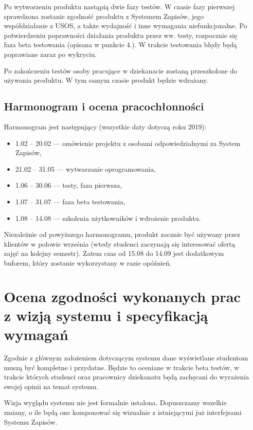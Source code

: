 \documentclass{article}
\begin{document}
Po wytworzeniu produktu nastąpią dwie fazy testów.
W czasie fazy pierwszej sprawdzona zostanie zgodność produktu z Systemem Zapisów, jego współdziałanie z USOS, a także wydajność i inne wymagania niefunkcjonalne.
Po potwierdzeniu poprawności działania produktu przez ww. testy, rozpocznie się faza beta testowania (opisana w punkcie 4.).
W trakcie testowania błędy będą poprawiane zaraz po wykryciu.

Po zakończeniu testów osoby pracujące w dziekanacie zostaną przeszkolone do używania produktu.
W tym samym czasie produkt będzie wdrażany.

\subsection{Harmonogram i ocena pracochłonności}
Harmonogram jest następujący (wszystkie daty dotyczą roku 2019):
\begin{itemize}
 \item 1.02 -- 20.02 --- omówienie projektu z osobami odpowiedzialnymi za System Zapisów,
 \item 21.02 -- 31.05 --- wytwarzanie oprogramowania,
 \item 1.06 -- 30.06 --- testy, faza pierwsza,
 \item 1.07 -- 31.07 --- faza beta testowania,
 \item 1.08 -- 14.08 --- szkolenia użytkowników i wdrożenie produktu.
\end{itemize}
Niezależnie od powyższego harmonogramu, produkt zacznie być używany przez klientów w połowie września (wtedy studenci zaczynają się interesować ofertą zajęć na kolejny semestr).
Zatem czas od 15.08 do 14.09 jest dodatkowym buforem, który zostanie wykorzystany w razie opóźnień.

\section{Ocena zgodności wykonanych prac z wizją systemu i specyfikacją wymagań}
Zgodnie z głównym założeniem dotyczącym systemu dane wyświetlane studentom muszą być kompletne i przydatne.
Będzie to oceniane w trakcie beta testów, w trakcie których studenci oraz pracownicy dziekanatu będą zachęcani do wyrażenia swojej opinii na temat systemu.

Wizja wyglądu systemu nie jest formalnie ustalona.
Dopuszczamy wszelkie zmiany, o ile będą one komponować się wizualnie z istniejącymi już interfejsami Systemu Zapisów.
\end{document}
